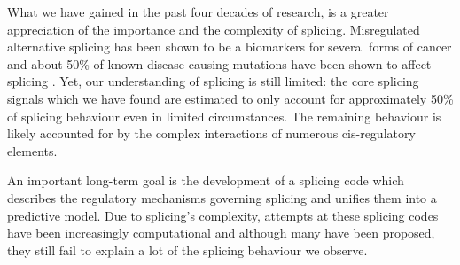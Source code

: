 What we have gained in the past four decades of research, is a greater appreciation of the importance and the complexity of splicing. 
Misregulated alternative splicing has been shown to be a biomarkers for several forms of cancer \cite{cancer} \cite{splicingcausescancer} and about 50\% of known disease-causing mutations have been shown to affect splicing \cite{50diseasessplicing}. 
Yet, our understanding of splicing is still limited: the core splicing signals which we have found are estimated to only account for approximately 50\% of splicing behaviour even in limited circumstances. The remaining behaviour is likely accounted for by the complex interactions of numerous cis-regulatory elements. 

An important long-term goal is the development of a splicing code which describes the regulatory mechanisms governing splicing \cite{longtermcall} and unifies them into a predictive model. Due to splicing's complexity, attempts at these splicing codes have been increasingly computational \cite{barash2010a} and although many have been proposed, they still fail to explain a lot of the splicing behaviour we observe. %




%
%









